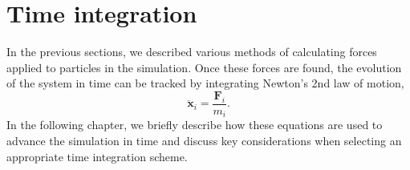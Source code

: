 \chapter{Time integration}
In the previous sections, we described various methods of calculating forces applied to particles in the simulation.
Once these forces are found, the evolution of the system in time can be tracked by integrating Newton's 2nd law of motion,
\begin{equation}\label{eq:newtons-second}
    \ddot{\mathbf{x}}_i = \frac{\mathbf{F}_i}{m_i}.
\end{equation}
In the following chapter, we briefly describe how these equations are used to advance the simulation in time and discuss key considerations when selecting an appropriate time integration scheme.



